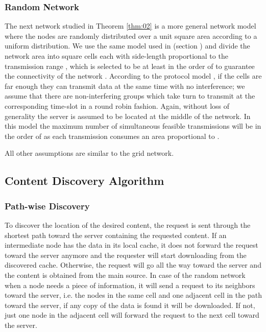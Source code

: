 \documentclass[journal]{IEEEtran}
\theoremstyle{plain}
\theoremstyle{remark}
\begin{document}
\subsubsection{Random Network}

The next network studied in Theorem \ref{thm:02} is a more general network model where the nodes are randomly distributed over a unit square area according to a uniform distribution. We use the same model used in \cite{book06:Xue} (section ) and divide the network area into square cells each with side-length proportional to the transmission range , which is selected to be at least in the order of  to guarantee the connectivity of the network \cite{Applied97:Penrose}. According to the protocol model \cite{book06:Xue}, if the cells are far enough they can transmit data at the same time with no interference; we assume that there are  non-interfering groups which take turn to transmit at the corresponding time-slot in a round robin fashion. Again, without loss of generality the server is assumed to be located at the middle of the network. In this model the maximum number of simultaneous feasible transmissions  will be in the order of  as each transmission consumes an area proportional to .

All other assumptions are similar to the grid network.

\subsection{Content Discovery Algorithm}

\subsubsection{Path-wise Discovery}

To discover the location of the desired content, the request is sent through the shortest path toward the server containing the requested content. If an intermediate node has the data in its local cache, it does not forward the request toward the server anymore and the requester will start downloading from the discovered cache. Otherwise, the request will go all the way toward the server and the content is obtained from the main source. In case of the random network when a node needs a piece of information, it will send a request to its neighbors toward the server, i.e. the nodes in the same cell and one adjacent cell in the path toward the server, if any copy of the data is found it will be downloaded. If not, just one node in the adjacent cell will forward the request to the next cell toward the server.
	
\end{document}
